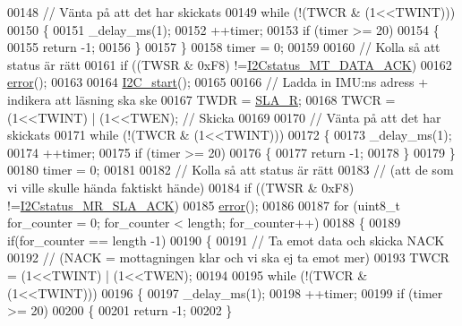 \begin{DoxyCode}
00148     \textcolor{comment}{// Vänta på att det har skickats}
00149     \textcolor{keywordflow}{while} (!(TWCR & (1<<TWINT)))
00150     \{
00151         \_delay\_ms(1);
00152         ++timer;
00153         \textcolor{keywordflow}{if} (timer >= 20)
00154         \{
00155             \textcolor{keywordflow}{return} -1;
00156         \}
00157     \}                   
00158     timer = 0;
00159 
00160     \textcolor{comment}{// Kolla så att status är rätt}
00161     \textcolor{keywordflow}{if} ((TWSR & 0xF8) !=\hyperlink{_i2_c_8h_a083e480a49a539cd4740d0e1a15216f3}{I2Cstatus\_MT\_DATA\_ACK})     
00162     \hyperlink{_i2_c_8c_ad1a5ba420409525ff5ab1be86ac5e526}{error}();
00163 
00164     \hyperlink{_i2_c_8c_a263c74ce484e3680c05a9118707fadb7}{I2C\_start}();
00165 
00166     \textcolor{comment}{// Ladda in IMU:ns adress + indikera att läsning ska ske}
00167     TWDR = \hyperlink{_i2_c_8h_ae4af1f304be9d3202a445e7d6c235eaa}{SLA\_R};                                  
00168     TWCR = (1<<TWINT) | (1<<TWEN);      \textcolor{comment}{// Skicka}
00169 
00170     \textcolor{comment}{// Vänta på att det har skickats}
00171     \textcolor{keywordflow}{while} (!(TWCR & (1<<TWINT)))
00172     \{
00173         \_delay\_ms(1);
00174         ++timer;
00175         \textcolor{keywordflow}{if} (timer >= 20)
00176         \{
00177             \textcolor{keywordflow}{return} -1;
00178         \}
00179     \}                   
00180     timer = 0;
00181 
00182     \textcolor{comment}{// Kolla så att status är rätt}
00183     \textcolor{comment}{// (att de som vi ville skulle hända faktiskt hände)}
00184     \textcolor{keywordflow}{if} ((TWSR & 0xF8) !=\hyperlink{_i2_c_8h_af046bfee1b2f1837e8a043ead63f8152}{I2Cstatus\_MR\_SLA\_ACK})       
00185     \hyperlink{_i2_c_8c_ad1a5ba420409525ff5ab1be86ac5e526}{error}();
00186 
00187     \textcolor{keywordflow}{for} (uint8\_t for\_counter = 0; for\_counter < length; for\_counter++)
00188     \{
00189         \textcolor{keywordflow}{if}(for\_counter == length -1)
00190         \{
00191             \textcolor{comment}{// Ta emot data och skicka NACK}
00192             \textcolor{comment}{// (NACK = mottagningen klar och vi ska ej ta emot mer)}
00193             TWCR = (1<<TWINT) | (1<<TWEN);                  
00194 
00195             \textcolor{keywordflow}{while} (!(TWCR & (1<<TWINT)))
00196             \{
00197                 \_delay\_ms(1);
00198                 ++timer;
00199                 \textcolor{keywordflow}{if} (timer >= 20)
00200                 \{
00201                     \textcolor{keywordflow}{return} -1;
00202                 \}

\end{DoxyCode}
